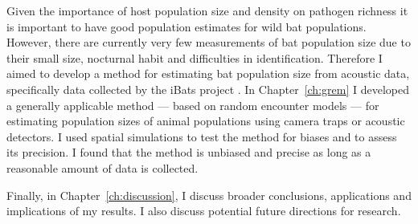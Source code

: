 
Given the importance of host population size and density on pathogen richness it is important to have good population estimates for wild bat populations.
However, there are currently very few measurements of bat population size due to their small size, nocturnal habit and difficulties in identification.
Therefore I aimed to develop a method for estimating bat population size from acoustic data, specifically data collected by the iBats project \cite{jones2011indicator}.
In Chapter~\ref{ch:grem} I developed a generally applicable method --- based on random encounter models \cite{rowcliffe2008estimating, yapp1956theory} --- for estimating population sizes of animal populations using camera traps or acoustic detectors.
I used spatial simulations to test the method for biases and to assess its precision.
I found that the method is unbiased and precise as long as a reasonable amount of data is collected.



Finally, in Chapter~\ref{ch:discussion}, I discuss broader conclusions, applications and implications of my results.
I also discuss potential future directions for research.












